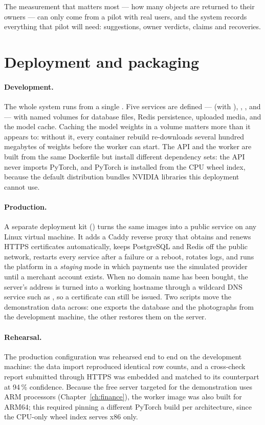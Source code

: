 The measurement that matters most --- how many objects are returned to their
owners --- can only come from a pilot with real users, and the system records
everything that pilot will need: suggestions, owner verdicts, claims and
recoveries.

\section{Deployment and packaging}

\paragraph{Development.} The whole system runs from a single
. Five services are defined ---  (with
), , ,  and 
--- with named volumes for database files, Redis persistence, uploaded media,
and the model cache. Caching the model weights in a volume matters more than it
appears to: without it, every container rebuild re-downloads several hundred
megabytes of weights before the worker can start. The API and the worker are
built from the same Dockerfile but install different dependency sets: the API
never imports PyTorch, and PyTorch is installed from the CPU wheel index,
because the default distribution bundles NVIDIA libraries this deployment
cannot use.

\paragraph{Production.} A separate deployment kit () turns the
same images into a public service on any Linux virtual machine. It adds a Caddy
reverse proxy that obtains and renews HTTPS certificates automatically, keeps
PostgreSQL and Redis off the public network, restarts every service after a
failure or a reboot, rotates logs, and runs the platform in a \emph{staging}
mode in which payments use the simulated provider until a merchant account
exists. When no domain name has been bought, the server's address is turned
into a working hostname through a wildcard DNS service such as
, so a certificate can still be issued. Two scripts move the
demonstration data across: one exports the database and the photographs from
the development machine, the other restores them on the server.

\paragraph{Rehearsal.} The production configuration was rehearsed end to end on
the development machine: the data import reproduced identical row counts, and a
cross-check report submitted through HTTPS was embedded and matched to its
counterpart at 94\,\% confidence. Because the free server targeted for the
demonstration uses ARM processors (Chapter~\ref{ch:finance}), the worker image
was also built for ARM64; this required pinning a different PyTorch build per
architecture, since the CPU-only wheel index serves x86 only.

